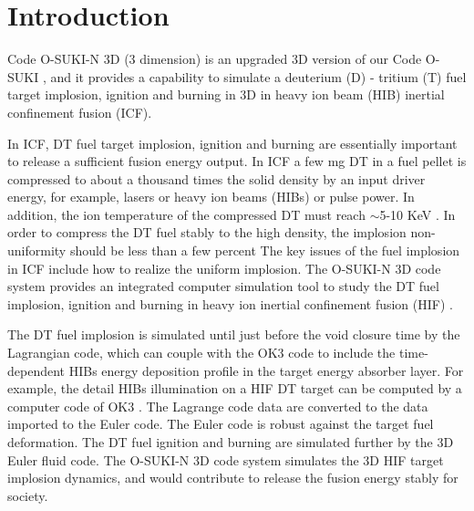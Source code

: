 %
\section{Introduction}\label{sec:1}

Code O-SUKI-N 3D (3 dimension) is an upgraded 3D version of our Code O-SUKI \cite{CPC-O-SUKI}, and it provides a capability to simulate a deuterium (D) - tritium (T) fuel target implosion, ignition and burning in 3D in heavy ion beam (HIB) inertial confinement fusion (ICF). 

In ICF, DT fuel target implosion, ignition and burning are essentially important to release a sufficient fusion energy output. In ICF a few mg DT in a fuel pellet is compressed to about a thousand times the solid density by an input driver energy, for example, lasers or heavy ion beams (HIBs) or pulse power. In addition, the ion temperature of the compressed DT must reach $\sim$5-10 KeV \cite{ICFBook}. In order to compress the DT fuel stably to the high density, the implosion non-uniformity should be less than a few percent\cite {kwtANDniu} The key issues of the fuel implosion in ICF include how to realize the uniform implosion. The O-SUKI-N 3D code system provides an integrated computer simulation tool to study the DT fuel implosion, ignition and burning in heavy ion inertial confinement fusion (HIF) \cite{Kawata1, Kawata2}. 
         
The DT fuel implosion is simulated until just before the void closure time by the Lagrangian code, which can couple with the OK3 code to include the time-dependent HIBs energy deposition profile in the target energy absorber layer. For example, the detail HIBs illumination on a HIF DT target can be computed by a computer code of OK3 \cite{ogoyski1, ogoyski2, ogoyski3}. The Lagrange code data are converted to the data imported to the Euler code. The Euler code is robust against the target fuel deformation. The DT fuel ignition and burning are simulated further by the 3D Euler fluid code. The O-SUKI-N 3D code system simulates the 3D HIF target implosion dynamics, and would contribute to release the fusion energy stably for society. 

%